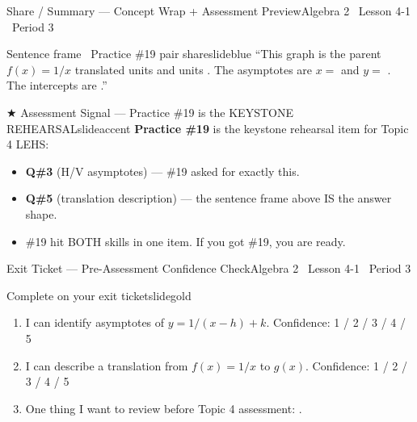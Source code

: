 \documentclass[aspectratio=169, 14pt]{beamer}
\begin{document}
\begin{frame}{Share / Summary --- Concept Wrap + Assessment Preview}{Algebra 2 \textperiodcentered\ Lesson 4-1 \textperiodcentered\ Period 3}
\vspace{0.1cm}
\begin{projcard}{Sentence frame \textperiodcentered\ Practice \#19 pair share}{slideblue}
\small
``This graph is the parent \(f(x) = 1/x\) translated \underline{\hspace{0.8cm}} units \underline{\hspace{0.8cm}} and \underline{\hspace{0.8cm}} units \underline{\hspace{0.8cm}}.
The asymptotes are \(x =\) \underline{\hspace{0.5cm}} and \(y =\) \underline{\hspace{0.5cm}}.
The intercepts are \underline{\hspace{1.8cm}}.''
\end{projcard}

\vspace{-0.1cm}
\begin{projcard}{\(\bigstar\) Assessment Signal --- Practice \#19 is the KEYSTONE REHEARSAL}{slideaccent}
\small
\textbf{Practice \#19} is the keystone rehearsal item for Topic 4 LEHS:
\begin{itemize}
  \setlength{\itemsep}{0pt}
  \item \textbf{Q\#3} (H/V asymptotes) --- \#19 asked for exactly this.
  \item \textbf{Q\#5} (translation description) --- the sentence frame above IS the answer shape.
  \item \#19 hit BOTH skills in one item. If you got \#19, you are ready.
\end{itemize}
\end{projcard}
\end{frame}

\begin{frame}{Exit Ticket --- Pre-Assessment Confidence Check}{Algebra 2 \textperiodcentered\ Lesson 4-1 \textperiodcentered\ Period 3}
\vspace{0.2cm}
\begin{projcard}{Complete on your exit ticket}{slidegold}
\begin{enumerate}
  \setlength{\itemsep}{0.2cm}
  \item I can identify asymptotes of \(y = 1/(x-h) + k\). \hfill Confidence: 1 / 2 / 3 / 4 / 5
  \item I can describe a translation from \(f(x) = 1/x\) to \(g(x)\). \hfill Confidence: 1 / 2 / 3 / 4 / 5
  \item One thing I want to review before Topic 4 assessment: \underline{\hspace{3.5cm}}.
\end{enumerate}
\end{projcard}
\end{frame}
\end{document}
